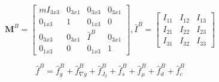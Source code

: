 \documentclass[letterpaper, preprint, paper,11pt]{AAS}	%
\begin{document}
\begin{equation}
\label{eq:mass_inertia}
\textbf{M}^B = 
\begin{bmatrix} 
mI_{3x3} & 0_{3x1} & 0_{3x3} & 0_{3x1} \\ 
0_{1x3} & 1 & 0_{1x3} & 0 \\ 
0_{3x3} & 0_{3x1} & \bar{I}^B & 0_{3x1} \\ 
0_{1x3} & 0 & 0_{1x3} & 1 
\end{bmatrix}, 
\bar{I}^B = 
\begin{bmatrix} 
I_{11} & I_{12}& I_{13} \\ 
I_{21} & I_{22}& I_{23}\\ 
I_{31} & I_{32}& I_{33}
\end{bmatrix}
\end{equation}

\begin{equation}
\label{eq:orbit_forces}
\hat{f}^B = \hat{f}^B_g + \hat{f}^B_{\nabla g} + \hat{f}^B_{J_2} +\hat{f}^B_{s}+\hat{f}^B_{\mu} + \hat{f}^B_d + \hat{f}^B_c
\end{equation}



\end{document}
